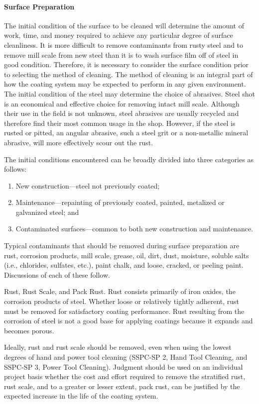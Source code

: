 \paragraph{Surface Preparation}
The initial condition of the surface to be cleaned will determine the amount of work, time, and money required to
achieve any particular degree of surface cleanliness. It is more difficult to remove contaminants from rusty steel and
to remove mill scale from new steel than it is to wash surface film off of steel in good condition. Therefore, it is
necessary to consider the surface condition prior to selecting the method of cleaning. The method of cleaning is an
integral part of how the coating system may be expected to perform in any given environment. The initial condition
of the steel may determine the choice of abrasives. Steel shot is an economical and effective choice for removing
intact mill scale. Although their use in the field is not unknown, steel abrasives are usually recycled and therefore
find their most common usage in the shop. However, if the steel is rusted or pitted, an angular abrasive, such a steel
grit or a non-metallic mineral abrasive, will more effectively scour out the rust.

The initial conditions encountered can be broadly divided into three categories as follows:
\begin{enumerate}
  \item New construction—steel not previously coated;
  \item Maintenance—repainting of previously coated, painted, metalized or galvanized steel; and
  \item Contaminated surfaces—common to both new construction and maintenance.
\end{enumerate}

Typical contaminants that should be removed during surface preparation are rust, corrosion products, mill scale,
grease, oil, dirt, dust, moisture, soluble salts (i.e., chlorides, sulfates, etc.), paint chalk, and loose, cracked, or peeling
paint. Discussions of each of these follow.

Rust, Rust Scale, and Pack Rust. Rust consists primarily of iron oxides, the corrosion products of steel.
Whether loose or relatively tightly adherent, rust must be removed for satisfactory coating performance. Rust
resulting from the corrosion of steel is not a good base for applying coatings because it expands and becomes porous.

Ideally, rust and rust scale should be removed, even when using the lowest degrees of hand and power tool
cleaning (SSPC-SP 2, Hand Tool Cleaning, and SSPC-SP 3, Power Tool Cleaning). Judgment should be used on an
individual project basis whether the cost and effort required to remove the stratified rust, rust scale, and to a greater
or lesser extent, pack rust, can be justified by the expected increase in the life of the coating system.

